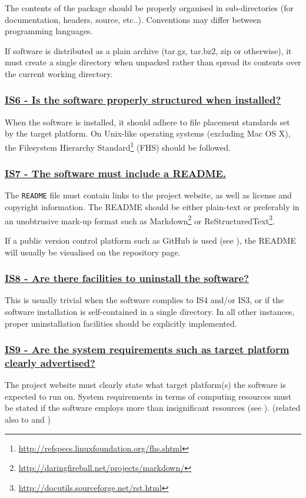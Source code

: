 \documentclass[a4paper,11pt]{article}
\newcommand{\criterion}[2]{\subsubsection*{\underline{#1 - #2}}\label{id:#1}}
\newcommand\CheckTable{%
  \begin{tabular}{ccccc}
    No & Minimal & Adequate & Good & Perfect \\
    0 & 1 & 2 & 3 & 4 \\
    \hline
    $\square$ & $\square$ & $\square$ & $\square$ & $\square$ \\
  \end{tabular}%
}
\newcommand{\refcrit}[1]{%
 \framebox[1.1\width]{\hyperref[id:#1]{#1}}
}
\begin{document}
The contents of the package should be properly organised in sub-directories
(for documentation, headers, source, etc..). Conventions may differ between
programming languages.

If software is distributed as a plain archive (tar.gz, tar.bz2, zip or otherwise),
it must create a single directory when unpacked rather than spread its contents
over the current working directory.


\newcommand{\isSixID}{IS6}
\newcommand{\isSixText}{Is the software properly structured when installed?}
\criterion{\isSixID}{\isSixText}

When the software is installed, it should adhere to file placement standards set
by the target platform. On Unix-like operating systems (excluding Mac OS X), the Filesystem
Hierarchy Standard\footnote{\url{http://refspecs.linuxfoundation.org/fhs.shtml}} (FHS) should be followed.


\newcommand{\isSevenID}{IS7}
\newcommand{\isSevenText}{The software must include a README.}
\criterion{\isSevenID}{\isSevenText}

The \texttt{README} file must contain links to the project website, as well as
license and copyright information. The README should be either plain-text or
preferably in an unobtrusive mark-up format such as
Markdown\footnote{\url{http://daringfireball.net/projects/markdown/}} or
ReStructuredText\footnote{\url{http://docutils.sourceforge.net/rst.html}}.

If a public version control platform such as GitHub is used (see \refcrit{AC2}), the
README will usually be visualised on the repository page.


\newcommand{\isEightID}{IS8}
\newcommand{\isEightText}{Are there facilities to uninstall the software?}
\criterion{\isEightID}{\isEightText}

This is usually trivial when the software complies to IS4 and/or IS3, or if the
software installation is self-contained in a single directory. In all other
instances, proper uninstallation facilities should be explicitly implemented.


\newcommand{\isNineID}{IS9}
\newcommand{\isNineText}{Are the system requirements such as target platform clearly advertised?}
\criterion{\isNineID}{\isNineText}

The project website must clearly state what target platform(s) the software is expected to run on.
System requirements in terms of computing resources must be stated if the
software employs more than insignificant resources (see \refcrit{PF2}).
(related also to \refcrit{B3} and \refcrit{IS2})
\end{document}
